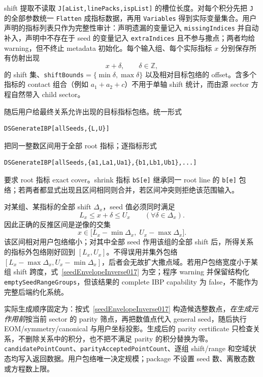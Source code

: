 ﻿\documentclass[a4paper,11pt]{article}
\begin{document}
shift 提取不读取 \texttt{J[aList,linePacks,ispList]} 的槽位长度。对每个积分先把 \texttt{J} 的全部参数统一 \texttt{Flatten} 成指标数据，再用 \texttt{Variables} 得到实际变量集合。用户声明的指标列表只作为完整性审计：声明遗漏的变量记入 \texttt{missingIndices} 并自动补入，声明中不存在于 seed 的变量记入 \texttt{extraIndices} 且不参与撒点；两者均给 warning，但不终止 metadata 初始化。每个输入组、每个实际指标 $x$ 分别保存所有仿射出现
\begin{equation}
 x+\delta,\qquad \delta\in\mathbb Z,
\end{equation}
的 shift 集、\texttt{shiftBounds}$=\{\min\delta,\max\delta\}$ 以及相对目标包络的 offset。含多个指标的 contact 组合（例如 $a_1+a_2+c$）不用于单轴 shift 统计，而由源 sector 方程自然带入 child sector。

随后用户给最终关系允许出现的目标指标包络。统一形式
\begin{verbatim}
DSGenerateIBP[allSeeds,{L,U}]
\end{verbatim}
把同一整数区间用于全部 root 指标；逐指标形式
\begin{verbatim}
DSGenerateIBP[allSeeds,{a1,La1,Ua1},{b1,Lb1,Ub1},...]
\end{verbatim}
要求 root 指标 exact cover。shrink 指标 \texttt{bS[e]} 继承同一 root line 的 \texttt{b[e]} 包络；若两者都显式出现且区间相同则合并，若区间冲突则拒绝该范围输入。

对某组、某指标的全部 shift $\Delta_x$，seed 值必须同时满足
\begin{equation}
 L_x\leq x+\delta\leq U_x\qquad (\forall\delta\in\Delta_x).
\end{equation}
因此正确的反推区间是逆像的交集
\begin{equation}
 x\in\bigl[L_x-\min\Delta_x,\;U_x-\max\Delta_x\bigr].
 \label{seedEnvelopeInverse017}
\end{equation}
该区间相对用户包络缩小；对其中全部 seed 作用该组的全部 shift 后，所得关系的指标外包络刚好回到 $[L_x,U_x]$。不得误用并集外包络 $[L_x-\max\Delta_x,U_x-\min\Delta_x]$，后者会无故扩大撒点域。若用户包络宽度小于某组 shift 跨度，式~\eqref{seedEnvelopeInverse017} 为空；程序 warning 并保留结构化 \texttt{emptySeedRangeGroups}，但该结果的 complete IBP capability 为 false，不能作为完整后端约化系统。

实际生成顺序固定为：按式~\eqref{seedEnvelopeInverse017} 构造候选整数点，\emph{在生成元作用前}按当前 sector 的 parity 筛点，再把数值点代入 general seed，随后执行 EOM/symmetry/canonical 与用户坐标投影。生成后的 parity certificate 只检查关系，不删除关系中的积分，也不把不满足 parity 的积分替换为零。\texttt{candidatePointCount}、\texttt{parityAcceptedPointCount}、逐组 shift/range 和空域状态均写入返回数据。用户包络唯一决定规模；package 不设置 seed 数、离散态数或方程数上限。
\end{document}
